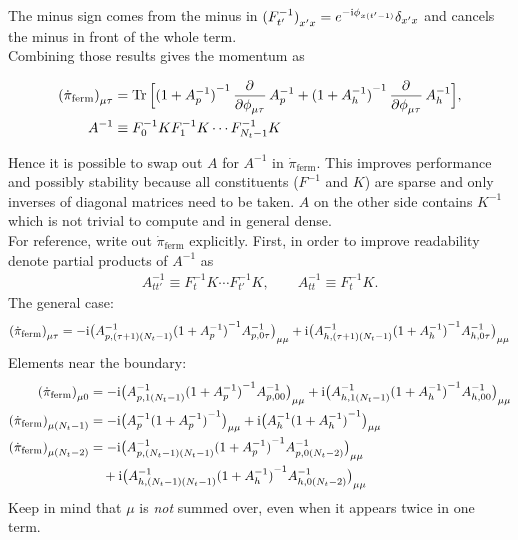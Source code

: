 \documentclass[a4paper, fleqn, twoside, notitlepage]{scrartcl}
\begin{document}
The minus sign comes from the minus in ${(F^{-1}_{t'})}_{x'x} = e^{-\mathrm{i}\phi_{x(t'-1)}}\delta_{x'x}$ and cancels the minus in front of the whole term.\\
Combining those results gives the momentum as
\begin{resultbox}
  \vspace{-\baselineskip}
  \begin{align}
    {(\dot{\pi}_{\text{ferm}})}_{\mu\tau} &= \Tr \Big[{(1+A_p^{-1})}^{-1}\dpd{}{\phi_{\mu\tau}}A_p^{-1} + {(1+A_h^{-1})}^{-1}\dpd{}{\phi_{\mu\tau}}A_h^{-1}\Big],\\
    A^{-1} &\equiv F_0^{-1}K F_1^{-1}K \cdots F_{N_t-1}^{-1}K\label{eq:def_Ainv}
  \end{align}
\end{resultbox}
\noindent Hence it is possible to swap out $A$ for $A^{-1}$ in $\dot{\pi}_{\text{ferm}}$. This improves performance and possibly stability because all constituents ($F^{-1}$ and $K$) are sparse and only inverses of diagonal matrices need to be taken. $A$ on the other side contains $K^{-1}$ which is not trivial to compute and in general dense.\\

\noindent
For reference, write out $\dot{\pi}_{\text{ferm}}$ explicitly. First, in order to improve readability denote partial products of $A^{-1}$ as
\begin{align}
  A^{-1}_{tt'} \equiv F_t^{-1}K \cdots F_{t'}^{-1}K, \qquad A^{-1}_{tt} \equiv F_t^{-1}K.
\end{align}
The general case:
\begin{align}
  {(\dot{\pi}_{\text{ferm}})}_{\mu\tau} = -\mathrm{i} {\big(A^{-1}_{p,(\tau+1)(N_t-1)} {(1+A_p^{-1})}^{-1} A^{-1}_{p,0\tau}\big)}_{\mu\mu} + \mathrm{i} {\big(A^{-1}_{h,(\tau+1)(N_t-1)} {(1+A_h^{-1})}^{-1} A^{-1}_{h,0\tau}\big)}_{\mu\mu}
\end{align}
Elements near the boundary:
\begin{align}
  {(\dot{\pi}_{\text{ferm}})}_{\mu0} &= -\mathrm{i} {\big(A^{-1}_{p,1(N_t-1)} {(1+A_p^{-1})}^{-1} A^{-1}_{p,00}\big)}_{\mu\mu} + \mathrm{i} {\big(A^{-1}_{h,1(N_t-1)} {(1+A_h^{-1})}^{-1} A^{-1}_{h,00}\big)}_{\mu\mu}\\
  {(\dot{\pi}_{\text{ferm}})}_{\mu(N_t-1)} &= -\mathrm{i} {\big(A^{-1}_{p} {(1+A_p^{-1})}^{-1}\big)}_{\mu\mu} + \mathrm{i} {\big(A^{-1}_{h} {(1+A_h^{-1})}^{-1}\big)}_{\mu\mu}\\
  {(\dot{\pi}_{\text{ferm}})}_{\mu(N_t-2)} &= -\mathrm{i} {\big(A^{-1}_{p,(N_t-1)(N_t-1)} {(1+A_p^{-1})}^{-1} A^{-1}_{p,0(N_t-2)}\big)}_{\mu\mu} \nonumber\\
                                 &\quad + \mathrm{i} {\big(A^{-1}_{h,(N_t-1)(N_t-1)} {(1+A_h^{-1})}^{-1} A^{-1}_{h,0(N_t-2)}\big)}_{\mu\mu}
\end{align}
Keep in mind that $\mu$ is \emph{not} summed over, even when it appears twice in one term.
\end{document}
